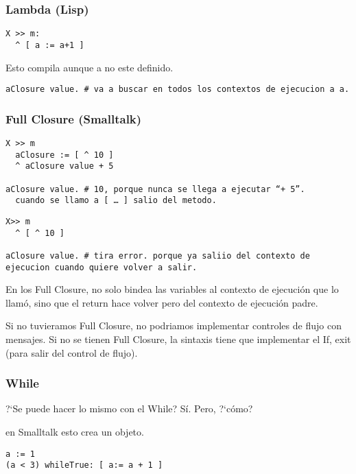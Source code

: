 \subsubsection{Lambda (Lisp)}

\begin{verbatim}
X >> m: 
  ^ [ a := a+1 ]
\end{verbatim}

Esto compila aunque a no este definido. 

\begin{verbatim}
aClosure value. # va a buscar en todos los contextos de ejecucion a a.
\end{verbatim}

\subsubsection{Full Closure (Smalltalk)}

\begin{verbatim}
X >> m
  aClosure := [ ^ 10 ]
  ^ aClosure value + 5

aClosure value. # 10, porque nunca se llega a ejecutar “+ 5”. 
  cuando se llamo a [ … ] salio del metodo. 
\end{verbatim}

\begin{verbatim}
X>> m 
  ^ [ ^ 10 ]

aClosure value. # tira error. porque ya saliio del contexto de ejecucion cuando quiere volver a salir. 
\end{verbatim}

En los Full Closure, no solo bindea las variables al contexto de ejecución que lo llamó, sino que el return hace volver pero del contexto de ejecución padre. 

Si no tuvieramos Full Closure, no podriamos implementar controles de flujo con mensajes. 
Si no se tienen Full Closure, la sintaxis tiene que implementar el If, exit (para salir del control de flujo). 

\subsubsection{While}
?`Se puede hacer lo mismo con el While? S\'i. Pero, ?`c\'omo? 

\code{[...]} en Smalltalk esto crea un objeto. 

\begin{verbatim}
a := 1
(a < 3) whileTrue: [ a:= a + 1 ]
\end{verbatim}

